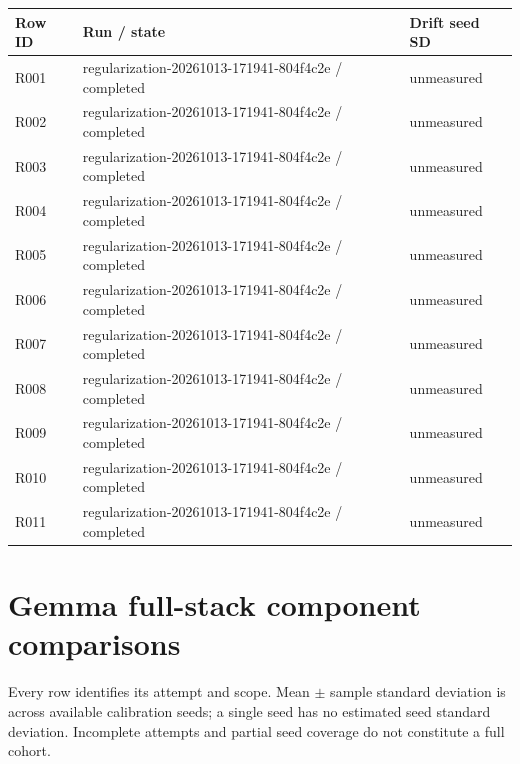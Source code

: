 \documentclass[10pt]{article}
\begin{document}
{\scriptsize\setlength{\tabcolsep}{2pt}
\begin{longtable}{p{}p{}p{}}
Row ID & Run / state & Drift seed SD \\
\hline\endhead
R001 & regularization-20261013-171941-804f4c2e / completed & unmeasured \\
R002 & regularization-20261013-171941-804f4c2e / completed & unmeasured \\
R003 & regularization-20261013-171941-804f4c2e / completed & unmeasured \\
R004 & regularization-20261013-171941-804f4c2e / completed & unmeasured \\
R005 & regularization-20261013-171941-804f4c2e / completed & unmeasured \\
R006 & regularization-20261013-171941-804f4c2e / completed & unmeasured \\
R007 & regularization-20261013-171941-804f4c2e / completed & unmeasured \\
R008 & regularization-20261013-171941-804f4c2e / completed & unmeasured \\
R009 & regularization-20261013-171941-804f4c2e / completed & unmeasured \\
R010 & regularization-20261013-171941-804f4c2e / completed & unmeasured \\
R011 & regularization-20261013-171941-804f4c2e / completed & unmeasured \\
\end{longtable}}

\section{Gemma full-stack component comparisons}

Every row identifies its attempt and scope. Mean \(\pm\) sample standard deviation is across available calibration seeds; a single seed has no estimated seed standard deviation. Incomplete attempts and partial seed coverage do not constitute a full cohort.
\end{document}
